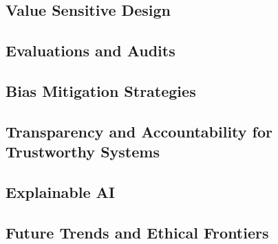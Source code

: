 \subsection{Value Sensitive Design}

\subsection{Evaluations and Audits} 

\subsection{Bias Mitigation Strategies}

\subsection{Transparency and Accountability for Trustworthy Systems}

\subsection{Explainable AI}

\subsection{Future Trends and Ethical Frontiers}